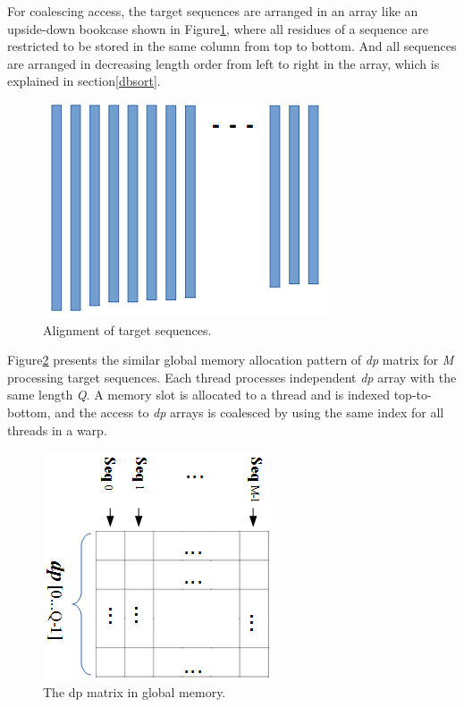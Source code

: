For coalescing access, the target sequences are arranged in an array like an upside-down bookcase shown in Figure\ref{fig:dbalign}, where all residues of a sequence are restricted to be stored in the same column from top to bottom. And all sequences are arranged in decreasing length order from left to right in the array, which is explained in section\ref{dbsort}. 

\begin{figure}[!htb]
	\centering
	\includegraphics[totalheight=0.2\textheight]{Figures/dbalign.png}
	\caption{\selectfont Alignment of target sequences.}
	\label{fig:dbalign}
\end{figure}

Figure\ref{fig:dp} presents the similar global memory allocation pattern of \emph{dp} matrix for \emph{M} processing target sequences. Each thread processes independent \emph{dp} array with the same length \emph{Q}. A memory slot is allocated to a thread and is indexed top-to-bottom, and the access to \emph{dp} arrays is coalesced by using the same index for all threads in a warp.

\begin{figure}[!htb]
	\centering
	\includegraphics[totalheight=0.2\textheight]{Figures/dp.png}
	\caption{\selectfont The dp matrix in global memory.}
	\label{fig:dp}
\end{figure}

